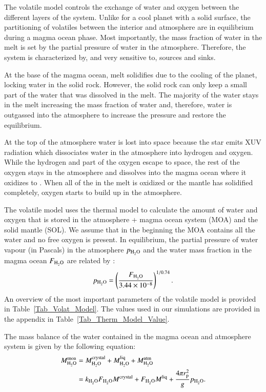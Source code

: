 \documentclass[paper=letterpaper,fontsize=12pt,oneside,twocolumn]{article}
\begin{document}
The volatile model controls the exchange of water and oxygen between the different layers of the system.
Unlike for a cool planet with a solid surface, the partitioning of volatiles between the interior and atmosphere are in equilibrium during a magma ocean phase. Most importantly, the mass fraction of water in the melt is set by the partial pressure of water in the atmosphere. Therefore, the system is characterized by, and very sensitive to, sources and sinks.

At the base of the magma ocean, melt solidifies due to the cooling of the planet, locking water in the solid rock. However, the solid rock can only keep a small part of the water that was dissolved in the melt. The majority of the water stays in the melt increasing the mass fraction of water and, therefore, water is outgassed into the atmosphere to increase the pressure and restore the equilibrium.

At the top of the atmosphere water is lost into space because the star emits XUV radiation which dissociates water in the atmosphere into hydrogen and oxygen.
While the hydrogen and part of the oxygen escape to space, the rest of the oxygen stays in the atmosphere and dissolves into the magma ocean where it oxidizes  to .
When all of the  in the melt is oxidized or the mantle has solidified completely, oxygen starts to build up in the atmosphere.

The volatile model uses the thermal model to calculate the amount of water and oxygen that is stored in the atmosphere + magma ocean system (MOA) and the solid mantle (SOL). We assume that in the beginning the MOA contains all the water and no free oxygen is present.
In equilibrium, the partial pressure of water vapour (in Pascals) in the atmosphere $p_{\ce{H2O}}$ and the water mass fraction in the magma ocean $F_{\ce{H2O}}$ are related by \citep{Papale1997}:
\begin{equation}
	p_{\ce{H2O}} = \left( \frac{ F_{\ce{H2O}} }{ 3.44 \times 10^{-8} } \right)^{1/0.74}.
	\label{water_equi}
\end{equation}
An overview of the most important parameters of the volatile model is provided in Table~\ref{Tab_Volat_Model}. 
The values used in our simulations are provided in the appendix in Table~\ref{Tab_Therm_Model_Value}. 

The mass balance of the water contained in the magma ocean and atmosphere system is given by the following equation:
\begin{equation}
	\begin{aligned}
		M_{\ce{H2O}}^{\mathrm{moa}} &= M_{\ce{H2O}}^{\mathrm{crystal}} + M_{\ce{H2O}}^{\mathrm{liq}} + M_{\ce{H2O}}^{\mathrm{atm}} \\
		&= k_{\ce{H2O}} F_{\ce{H2O}} M^{\mathrm{crystal}} + F_{\ce{H2O}} M^{\mathrm{liq}} + \frac{4 \pi r_\mathrm{p}^2}{g} p_{\ce{H2O}}.
	\end{aligned}
\end{equation}
\end{document}
